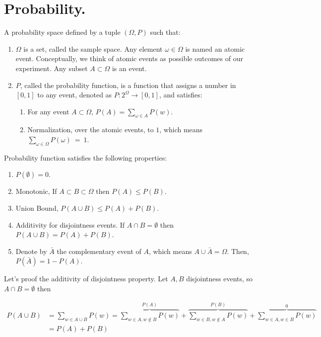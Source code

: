 


\ifdefined\BOOK
\else
\setcounter{chapter}{6}
\fi
\chapter{Probability.} 

\begin{definition}
  A probability space defined by a tuple $(\Omega,P)$ such that:
  \begin{enumerate} 
    \item $\Omega$ is a set, called the sample space. Any element $\omega\in \Omega$ is named an atomic event. Conceptually, we think of atomic events as possible outcomes of our experiment. Any subset $A \subset \Omega$ is an event. 
    \item $P$, called the probability function, is a function that assigns a number in $[0,1]$ to any event, denoted as $P : 2^\Omega \rightarrow [0,1]$, and satisfies:
      \begin{enumerate}
        \item For any event $A \subset \Omega$, $P(A) = \sum_{\omega\in A}P(w)$. 
        \item Normalization, over the atomic events, to $1$, which means $\sum_{\omega\in\Omega}P(\omega)~=~1$.
      \end{enumerate}
  \end{enumerate}
\end{definition}

\begin{claim}
Probability function  satisfies the following properties:
\begin{enumerate}
  \item $P(\emptyset) = 0$.
  \item Monotonic, If $A \subset B \subset \Omega$ then $P(A) \le P(B)$.
  \item Union Bound, $P(A \cup B) \le P(A) + P(B)$.
  \item Additivity for disjointness events. If $A\cap B = \emptyset$ then $P(A \cup B) = P(A) + P(B)$.
  \item Denote by $\bar{A}$ the complementary event of $A$, which means $A\cup\bar{A} = \Omega$. Then, $P(\bar{A}) = 1 - P(A)$.
\end{enumerate}
\end{claim}

\begin{example}
  Let's proof the additivity of disjointness property. Let $A,B$ disjointness events, so $A \cap B = \emptyset$ then 
  
  \begin{equation*}
    \begin{split}
      P(A\cup B) &= \sum_{w \in A \cup B}P(w) = \overbrace{\sum_{w \in A, w \notin{B}}P(w)}^{P(A)} + \overbrace{\sum_{w \in B, w \notin A}P(w)}^{P(B)}  +\overbrace{ \sum_{w \in A, w \in  B}P(w) }^{ 0 } \\ 
      &= P(A) + P(B) 
    \end{split}
  \end{equation*}
\end{example}

